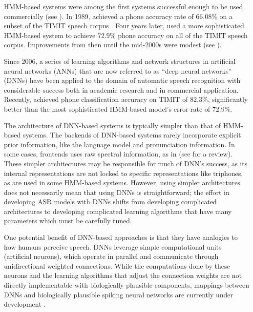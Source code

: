 
HMM-based systems
were among the first systems
successful enough to be
used commercially
(see \citealt{huang2014}).
In 1989, \citet{lee1989}
achieved a phone accuracy rate of
66.08\% on a subset of the
TIMIT speech corpus \citep{garofolo1993}.
Four years later,
\citet{lamel1993}
used a more sophisticated HMM-based system
to achieve 72.9\% phone accuracy on
all of the TIMIT speech corpus.
Improvements from then until
the mid-2000s were modest
(see \citealt{lopes2011}).

Since 2006, a series of learning algorithms
and network structures in artificial neural networks (ANNs)
that are now referred to as ``deep neural networks'' (DNNs)
have been applied to
the domain of automatic speech recognition
with considerable success
both in academic research
and in commercial application.
Recently, \citet{graves2013}
achieved phone classification accuracy
on TIMIT of 82.3\%,
significantly better than the most sophisticated
HMM-based model's error rate of 72.9\%.

The architecture of DNN-based systems
is typically simpler
than that of HMM-based systems.
The backends of DNN-based systems
rarely incorporate explicit
prior information,
like the language model
and pronunciation information.
In some cases,
frontends uses raw spectral information,
as in \citet{mohamed2012}
(see \citealt{hinton2012}
for a review).
These simpler architectures may be
responsible for much of DNN's success,
as its internal representations
are not locked to specific representations
like triphones,
as are used in some HMM-based systems.
However, using simpler architectures
does not necessarily mean that
using DNNs is straightforward;
the effort in developing ASR models
with DNNs shifts from
developing complicated architectures
to developing complicated learning algorithms
that have many parameters
which must be carefully tuned.

One potential benefit of DNN-based approaches
is that they have analogies to
how humans perceive speech.
DNNs leverage simple computational units
(artificial neurons),
which operate in parallel
and communicate through unidirectional
weighted connections.
While the computations done by these neurons
and the learning algorithms that adjust
the connection weights
are not directly implementable
with biologically plausible components,
mappings between DNNs
and biologically plausible spiking neural networks
are currently under development
\citep{hunsberger2015}.

